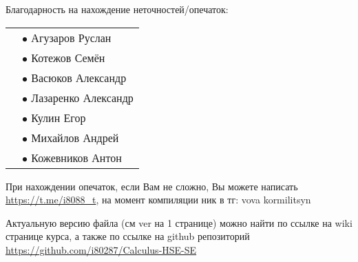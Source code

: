 Благодарность на нахождение неточностей/опечаток:

\begin{tabular}{rl}
    & $\bullet$ Агузаров Руслан \\
    & $\bullet$ Котежов Семён \\
    & $\bullet$ Васюков Александр \\
    & $\bullet$ Лазаренко Александр \\
    & $\bullet$ Кулин Егор \\
    & $\bullet$ Михайлов Андрей \\
    & $\bullet$ Кожевников Антон \\
\end{tabular}

При нахождении опечаток, если Вам не сложно, Вы можете написать \url{https://t.me/i8088_t}, на момент компиляции ник в тг: vova kormilitsyn

Актуальную версию файла (см ver на 1 странице) можно найти по ссылке на wiki странице курса, 
а также по ссылке на github репозиторий \url{https://github.com/i80287/Calculus-HSE-SE}
